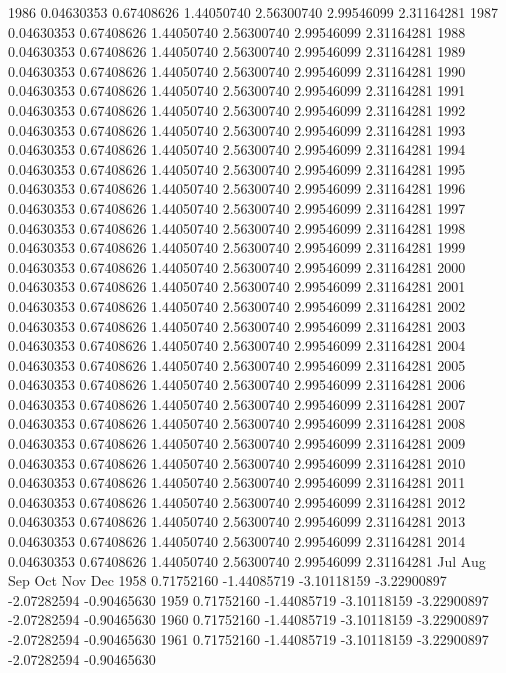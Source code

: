 \documentclass[11pt, a4paper]{article} %
\begin{document}
\begin{Schunk}
\begin{Soutput}
1986  0.04630353  0.67408626  1.44050740  2.56300740  2.99546099  2.31164281
1987  0.04630353  0.67408626  1.44050740  2.56300740  2.99546099  2.31164281
1988  0.04630353  0.67408626  1.44050740  2.56300740  2.99546099  2.31164281
1989  0.04630353  0.67408626  1.44050740  2.56300740  2.99546099  2.31164281
1990  0.04630353  0.67408626  1.44050740  2.56300740  2.99546099  2.31164281
1991  0.04630353  0.67408626  1.44050740  2.56300740  2.99546099  2.31164281
1992  0.04630353  0.67408626  1.44050740  2.56300740  2.99546099  2.31164281
1993  0.04630353  0.67408626  1.44050740  2.56300740  2.99546099  2.31164281
1994  0.04630353  0.67408626  1.44050740  2.56300740  2.99546099  2.31164281
1995  0.04630353  0.67408626  1.44050740  2.56300740  2.99546099  2.31164281
1996  0.04630353  0.67408626  1.44050740  2.56300740  2.99546099  2.31164281
1997  0.04630353  0.67408626  1.44050740  2.56300740  2.99546099  2.31164281
1998  0.04630353  0.67408626  1.44050740  2.56300740  2.99546099  2.31164281
1999  0.04630353  0.67408626  1.44050740  2.56300740  2.99546099  2.31164281
2000  0.04630353  0.67408626  1.44050740  2.56300740  2.99546099  2.31164281
2001  0.04630353  0.67408626  1.44050740  2.56300740  2.99546099  2.31164281
2002  0.04630353  0.67408626  1.44050740  2.56300740  2.99546099  2.31164281
2003  0.04630353  0.67408626  1.44050740  2.56300740  2.99546099  2.31164281
2004  0.04630353  0.67408626  1.44050740  2.56300740  2.99546099  2.31164281
2005  0.04630353  0.67408626  1.44050740  2.56300740  2.99546099  2.31164281
2006  0.04630353  0.67408626  1.44050740  2.56300740  2.99546099  2.31164281
2007  0.04630353  0.67408626  1.44050740  2.56300740  2.99546099  2.31164281
2008  0.04630353  0.67408626  1.44050740  2.56300740  2.99546099  2.31164281
2009  0.04630353  0.67408626  1.44050740  2.56300740  2.99546099  2.31164281
2010  0.04630353  0.67408626  1.44050740  2.56300740  2.99546099  2.31164281
2011  0.04630353  0.67408626  1.44050740  2.56300740  2.99546099  2.31164281
2012  0.04630353  0.67408626  1.44050740  2.56300740  2.99546099  2.31164281
2013  0.04630353  0.67408626  1.44050740  2.56300740  2.99546099  2.31164281
2014  0.04630353  0.67408626  1.44050740  2.56300740  2.99546099  2.31164281
             Jul         Aug         Sep         Oct         Nov         Dec
1958  0.71752160 -1.44085719 -3.10118159 -3.22900897 -2.07282594 -0.90465630
1959  0.71752160 -1.44085719 -3.10118159 -3.22900897 -2.07282594 -0.90465630
1960  0.71752160 -1.44085719 -3.10118159 -3.22900897 -2.07282594 -0.90465630
1961  0.71752160 -1.44085719 -3.10118159 -3.22900897 -2.07282594 -0.90465630

\end{Soutput}
\end{Schunk}
\end{document}
